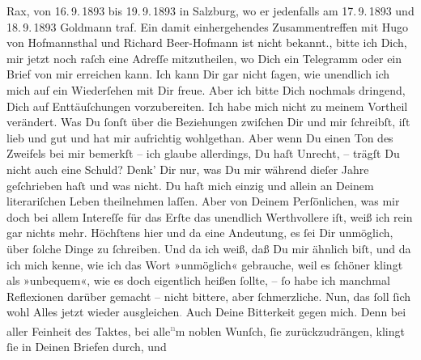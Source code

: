 \begin{ledgroupsized}[t]{13cm}
{{{                     Rax, von 16. 9. 1893 bis 19. 9. 1893 in Salzburg, wo er
                  jedenfalls am 17. 9. 1893 und 18. 9. 1893{ }Goldmann traf. Ein damit einhergehendes
                  Zusammentreffen mit Hugo von Hofmannsthal
                  und Richard Beer-Hofmann ist nicht
                  bekannt.}}}\label{K_L02712-2h}, bitte ich Dich, mir jetzt noch raſch eine Adreſſe mitzutheilen,
               wo Dich ein Telegramm oder ein Brief von mir erreichen kann. Ich kann Dir gar nicht
               ſagen, wie unendlich ich mich auf ein Wiederſehen mit Dir freue. Aber ich bitte Dich
               nochmals dringend, Dich auf Enttäuſchungen vorzubereiten. Ich habe mich nicht zu
               meinem Vortheil verändert.\pend
           \pstart
           Was Du ſonſt über die Beziehungen zwiſchen Dir und mir ſchreibſt, iſt lieb und gut
               und hat mir aufrichtig wohlgethan. Aber wenn Du einen Ton des Zweifels bei {\pb}mir bemerkſt – ich glaube allerdings, Du haſt
               Unrecht, – trägſt Du nicht auch eine Schuld? Denk’ Dir nur, was Du mir während dieſer
               Jahre geſchrieben haſt und was nicht. Du haſt mich einzig und allein an Deinem
               literariſchen Leben theilnehmen laſſen. Aber von Deinem Perſönlichen, was mir doch
               bei allem Intereſſe für das Erſte das unendlich Werthvollere iſt, weiß ich rein gar
               nichts mehr. Höchſtens hier und da eine Andeutung, es ſei Dir unmöglich, über ſolche
               Dinge zu ſchreiben. Und da ich weiß, daß Du mir ähnlich biſt, und da ich mich kenne,
               wie ich das Wort »unmöglich« gebrauche, weil es ſchöner klingt als »unbequem«, {\pb}wie es doch eigentlich heißen ſollte, – ſo habe ich
               manchmal Reflexionen darüber gemacht – nicht bittere, aber ſchmerzliche. Nun, das
               ſoll ſich wohl Alles jetzt wieder ausgleichen\textcolor{gray}{.} Auch Deine
               Bitterkeit gegen mich. Denn bei aller Feinheit des Taktes, bei alle\substVorne{}\textsuperscript{\textcolor{gray}{n}}\substDazwischen{}m\substHinten{} noblen Wunſch, ſie zurückzudrängen, klingt ſie in Deinen Briefen durch, und

\end{ledgroupsized}
